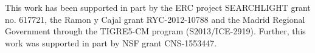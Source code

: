 This work has been supported in part by the ERC project
SEARCHLIGHT grant no. 617721, the Ramon y Cajal
grant RYC-2012-10788 and the Madrid Regional Government
through the TIGRE5-CM program (S2013/ICE-2919). Further,
this work was supported in part by NSF grant CNS-1553447.
